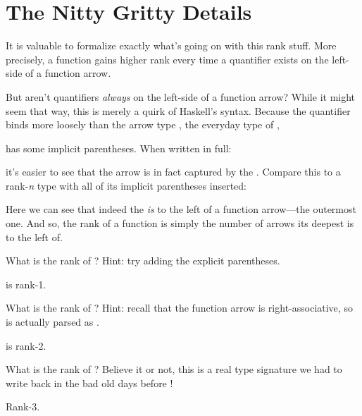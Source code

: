 \documentclass[book.tex]{subfiles}
\begin{document}
\section{The Nitty Gritty Details}

It is valuable to formalize exactly what's going on with this rank stuff. More
precisely, a function gains higher rank every time a  quantifier
exists on the left-side of a function arrow.

But aren't  quantifiers \emph{always} on the left-side of a function
arrow? While it might seem that way, this is merely a quirk of Haskell's syntax.
Because the  quantifier binds more loosely than the arrow type
\hs{(->)}, the everyday type of ,


has some implicit parentheses. When written in full:


it's easier to see that the arrow is in fact captured by the .
Compare this to a rank-\emph{n} type with all of its implicit parentheses inserted:


Here we can see that indeed the  \emph{is} to the left of
a function arrow---the outermost one. And so, the rank of a function is simply
the number of arrows its deepest  is to the left of.

\begin{exercise}
What is the rank of ? Hint: try adding the
explicit parentheses.
\end{exercise}
\begin{solution}
   is rank-1.
\end{solution}

\begin{exercise}
What is the rank of ? Hint:
recall that the function arrow is right-associative, so  is
actually parsed as .
\end{exercise}
\begin{solution}
   is rank-2.
\end{solution}

\begin{exercise}
What is the rank of ? Believe it or not, this is a real type signature we had to write back in
the bad old days before !
\end{exercise}
\begin{solution}
  Rank-3.
\end{solution}
\end{document}
